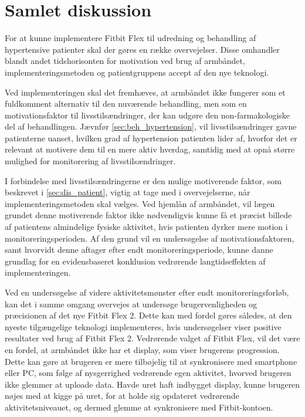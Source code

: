 \section{Samlet diskussion}

For at kunne implementere Fitbit Flex til udredning og behandling af hypertensive patienter skal der gøres en række overvejelser. Disse omhandler blandt andet tidshorisonten for motivation ved brug af armbåndet, implementeringsmetoden og patientgruppens accept af den nye teknologi. 

Ved implementeringen skal det fremhæves, at armbåndet ikke fungerer som et fuldkomment alternativ til den nuværende behandling, men som en motivationsfaktor til livsstilsændringer, der kan udgøre den non-farmakologiske del af behandlingen. Jævnfør \autoref{sec:beh_hypertension}, vil livsstilsændringer gavne patienterne uanset, hvilken grad af hypertension patienten lider af, hvorfor det er relevant at motivere dem til en mere aktiv hverdag, samtidig med at opnå større mulighed for monitorering af livsstilsændringer.

I forbindelse med livsstilsændringerne er den mulige motiverende faktor, som beskrevet i \autoref{sec:dis_patient}, vigtig at tage med i overvejelserne, når implementeringsmetoden skal vælges. Ved hjemlån af armbåndet, vil lægen grundet denne motiverende faktor ikke nødvendigvis kunne få et præcist billede af patientens almindelige fysiske aktivitet, hvis patienten dyrker mere motion i monitoreringsperioden. Af den grund vil en undersøgelse af motivationsfaktoren, samt hvorvidt denne aftager efter endt monitoreringsperiode, kunne danne grundlag for en evidensbaseret konklusion vedrørende langtidseffekten af implementeringen.

Ved en undersøgelse af videre aktivitetsmønster efter endt monitoreringsforløb, kan det i samme omgang overvejes at undersøge brugervenligheden og præcisionen af det nye Fitbit Flex 2. Dette kan med fordel gøres således, at den nyeste tilgængelige teknologi implementeres, hvis undersøgelser viser positive resultater ved brug af Fitbit Flex 2. Vedrørende valget af Fitbit Flex, vil det være en fordel, at armbåndet ikke har et display, som viser brugerens progression. Dette kan gøre at brugeren er mere tilbøjelig til at synkronisere med smartphone eller PC, som følge af nysgerrighed vedrørende egen aktivitet, hvorved brugeren ikke glemmer at uploade data. Havde uret haft indbygget display, kunne brugeren nøjes med at kigge på uret, for at holde sig opdateret vedrørende aktivitetsniveauet, og dermed glemme at synkronisere med Fitbit-kontoen.

